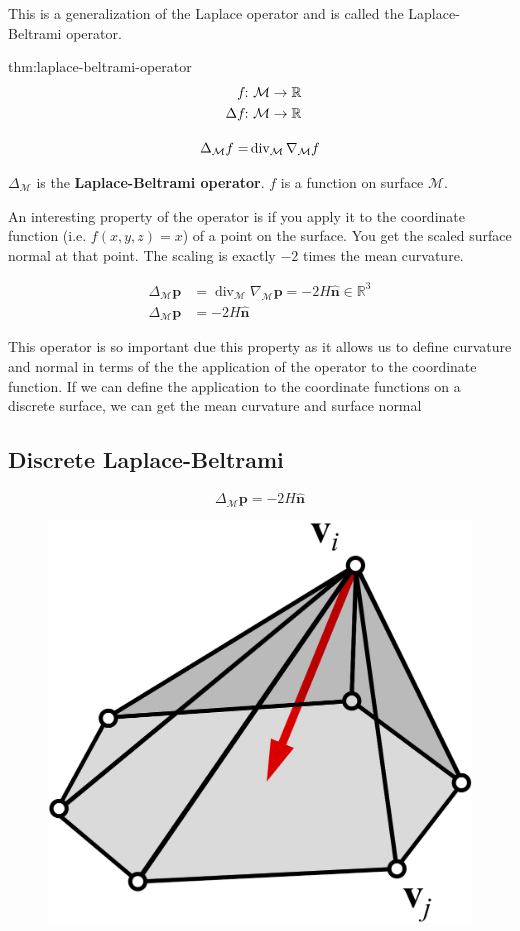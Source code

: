 \documentclass{article}
\begin{document}
This is a generalization of the Laplace operator and is called the Laplace-Beltrami operator.


\begin{defin}{thm:laplace-beltrami-operator}
    \begin{align*}
        f\!\!:& \ \mathcal{M} \to \mathbb{R}\\
        \Delta f\!\!:& \ \mathcal{M} \to \mathbb{R}\\[10px]
        \Delta_{\mathcal{M}} f =& \operatorname{div}_{\mathcal{M}} \nabla_{\mathcal{M}} f
    \end{align*}

    \(\Delta_{\mathcal{M}}\) is the \textbf{Laplace-Beltrami operator}.
    \(f\) is a function on surface \(\mathcal{M}\).
\end{defin}


An interesting property of the operator is if you apply it to the coordinate function (i.e. \(f(x,y,z) = x\))
of a point on the surface. You get the scaled surface normal at that point. The scaling is exactly
\(-2\) times the mean curvature.

\begin{align*}
    \Delta_{\mathcal{M}} \mathbf{p} &= \operatorname{div}_{\mathcal{M}} \nabla_{\mathcal{M}} \mathbf{p} = -2H \mathbf{\hat{n}} \in \mathbb{R}^{3}\\
    \Delta_{\mathcal{M}} \mathbf{p} &= -2H \mathbf{\hat{n}}
\end{align*}


This operator is so important due this property as it allows us to define curvature and normal in terms of 
the the application of the operator to the coordinate function. If we can define the application to the
coordinate functions on a discrete surface, we can get the mean curvature and surface normal


\newpage
\subsection{Discrete Laplace-Beltrami}

\[
    \Delta_{\mathcal{M}} \mathbf{p} = -2H \mathbf{\hat{n}}
\]

\begin{figure}[!ht]
    \centering
    \includegraphics[width=0.2\linewidth]{images/dlb_mesh.png}
\end{figure}
\end{document}
